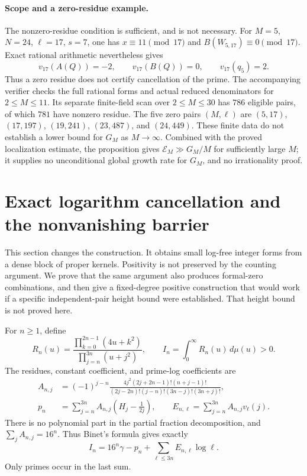 \documentclass[11pt,a4paper]{article}
\theoremstyle{definition}
\theoremstyle{remark}
\begin{document}
\paragraph{Scope and a zero-residue example.}
The nonzero-residue condition is sufficient, and is not necessary.
For $M=5$, $N=24$, $\ell=17$, $s=7$, one has
$x\equiv11\pmod{17}$ and $B(W_{5,17})\equiv0\pmod{17}$.
Exact rational arithmetic nevertheless gives
\[
 v_{17}(A(Q))=-2,\qquad v_{17}(B(Q))=0,\qquad
 v_{17}(q_5)=2.
\]
Thus a zero residue does not certify cancellation of the prime.
The accompanying verifier checks the full rational forms and actual
reduced denominators for $2\le M\le11$.  Its separate finite-field
scan over $2\le M\le30$ has $786$ eligible pairs, of which $781$
have nonzero residue.  The five zero pairs $(M,\ell)$ are
$(5,17)$, $(17,197)$, $(19,241)$, $(23,487)$, and $(24,449)$.
These finite data do not establish a lower bound for $G_M$ as
$M\to\infty$.  Combined with the proved localization estimate,
the proposition gives $\mathcal E_M\gg G_M/M$ for sufficiently
large $M$; it supplies no unconditional global growth rate for
$G_M$, and no irrationality proof.



\section{Exact logarithm cancellation and the nonvanishing barrier}
\label{stage3-counting-section}

This section changes the construction. It obtains small log-free integer
forms from a dense block of proper kernels. Positivity is not preserved
by the counting argument. We prove that the same argument also produces
formal-zero combinations, and then give a fixed-degree positive
construction that would work if a specific independent-pair height bound
were established. That height bound is not proved here.

For $n\ge1$, define
\[
 R_n(u)=\frac{\prod_{k=0}^{2n-1}(4u+k^2)}
              {\prod_{j=n}^{3n}(u+j^2)},\qquad
 I_n=\int_0^\infty R_n(u)\,d\mu(u)>0.
\]
The residues, constant coefficient, and prime-log coefficients are
\begin{align*}
 A_{n,j}&=(-1)^{j-n}
 \frac{4j^2(2j+2n-1)!(n+j-1)!}
 {(2j-2n)!(j-n)!(3n-j)!(3n+j)!},\\
 p_n&=\sum_{j=n}^{3n}A_{n,j}\left(H_j-\frac1{2j}\right),\qquad
 E_{n,\ell}=\sum_{j=n}^{3n}A_{n,j}v_\ell(j).
\end{align*}
There is no polynomial part in the partial fraction decomposition, and
$\sum_j A_{n,j}=16^n$. Thus Binet's formula gives exactly
\begin{equation}\label{stage3-proper-linear-form}
 I_n=16^n\gamma-p_n+\sum_{\ell\le3n}E_{n,\ell}\log\ell.
\end{equation}
Only primes occur in the last sum.
\end{document}

